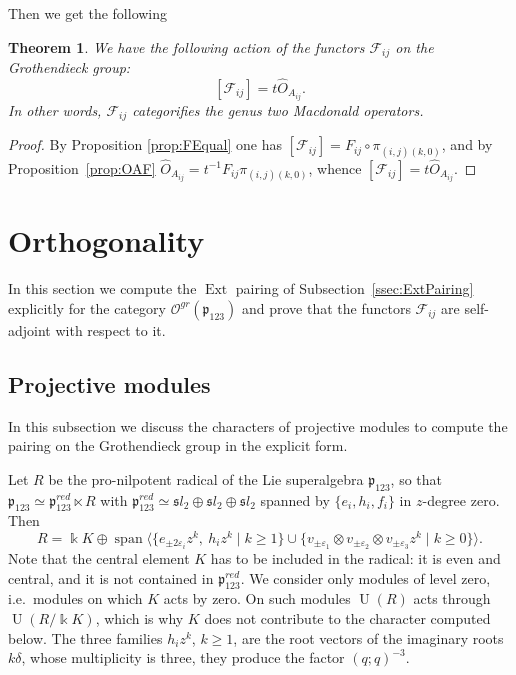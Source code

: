 \documentclass[10pt]{amsart}
\newtheorem{theoremB}{Theorem}
\newcommand{\fsl}{{\mathfrak sl}}
\newcommand{\fp}{{\mathfrak p}}
\newcommand{\spn}{\operatorname{span}}
\DeclareMathOperator{\U}{U}
\DeclareMathOperator{\Ext}{Ext}
\begin{document}
	Then we get the following
	\begin{theoremB}\label{thm:MainTheorem}
		We have the following action of the functors $\mathcal{F}_{ij}$ on the Grothendieck group:
		\[[\mathcal{F}_{ij}]=t \hat O_{A_{ij}}.\]
		In other words, $\mathcal{F}_{ij}$ categorifies the genus two Macdonald operators.
	\end{theoremB}
  \begin{proof}
        By Proposition \ref{prop:FEqual} one has $[\mathcal{F}_{ij}]=F_{ij}\circ\pi_{(i,j)(k,0)}$, and by Proposition~\ref{prop:OAF} $\hat O_{A_{ij}}=t^{-1}F_{ij}\pi_{(i,j)(k,0)}$, whence $[\mathcal{F}_{ij}]=t\hat O_{A_{ij}}$. 
    \end{proof}
    
	\section{Orthogonality}\label{sec:Orthogonality}
	In this section we compute the $\Ext$ pairing of Subsection~\ref{ssec:ExtPairing} explicitly for the category $\mathcal{O}^{gr}(\fp_{123})$ and prove that the functors $\mathcal{F}_{ij}$ are self-adjoint with respect to it.
	
	\subsection{Projective modules}\label{ssec:ProjectiveModules}
	In this subsection we discuss the characters of projective modules to compute the pairing on the Grothendieck group in the explicit form.
	
	Let $R$ be the pro-nilpotent radical of the Lie superalgebra $\fp_{123}$, so that $\fp_{123}\simeq \fp_{123}^{red}\ltimes R$ with $\fp_{123}^{red}\simeq \fsl_2\oplus \fsl_2 \oplus \fsl_2$ spanned by $\{e_i,h_i,f_i\}$ in $z$-degree zero. Then
	\[R=\Bbbk K \oplus \spn\bigl\langle \{e_{\pm 2 \varepsilon_i}z^k,\ h_iz^k \mid k \geq 1\} \cup \{v_{\pm \varepsilon_1 }\otimes v_{\pm \varepsilon_2} \otimes v_{\pm \varepsilon_3} z^k \mid k \geq 0\}\bigr\rangle.\]
	Note that the central element $K$ has to be included in the radical: it is even and central, and it is not contained in $\fp_{123}^{red}$. We consider only modules of level zero, i.e.\ modules on which $K$ acts by zero. On such modules $\U(R)$ acts through $\U(R/\Bbbk K)$, which is why $K$ does not contribute to the character computed below. The three families $h_iz^k$, $k \geq 1$, are the root vectors of the imaginary roots $k\delta$, whose multiplicity is three, they produce the factor $(q;q)^{-3}$.
\end{document}
